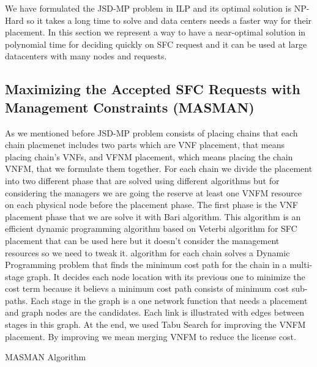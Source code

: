 We have formulated the JSD-MP problem in ILP and its optimal solution is NP-Hard so it takes a long time to solve and data centers needs a faster way for their placement.
In this section we represent a way to have a near-optimal solution in polynomial time for deciding quickly on SFC request and it can be used at large datacenters with many nodes and requests.

\subsection{Maximizing the Accepted SFC Requests with Management Constraints (MASMAN)}
As we mentioned before JSD-MP problem consists of placing chains that each chain placmenet includes two parts which are VNF placement, that means placing chain's VNFs, and VFNM placement, which means placing the chain VNFM, that we formulate them together.
For each chain we divide the placement into two different phase that are solved using different algorithms but for considering the managers we are going the reserve at least one VNFM resource on each physical node before the placement phase.
The first phase is the VNF placement phase that we are solve it with Bari \cite{Bari2015} algorithm.
This algorithm is an efficient dynamic programming algorithm based on Veterbi algorithm for SFC placement that can be used here but it doesn't consider the management resources so we need to tweak it.
\cite{Bari2015} algorithm for each chain solves a Dynamic Programming problem that finds the minimum cost path for the chain in a multi-stage graph.
It decides each node location with its previous one to minimize the cost term because it believs a minimum cost path consists of minimum cost sub-paths.
Each stage in the graph is a one network function that needs a placement and graph nodes are the candidates. Each link is illustrated with edges between stages in this graph.
At the end, we used Tabu Search for improving the VNFM placement. By improving we mean merging VNFM to reduce the license cost.

\begin{algorithm}
  \caption{MASMAN Algorithm}
  \label{alg:masman}
  \begin{algorithmic}[1]
      \EndIf
      \EndFor
      \Else
      \EndIf
      \EndIf
      \EndFor
      \EndFor
      \EndIf
      \EndFor
      \EndIf
      \EndFor
    \EndFor
    \EndFunction
  \end{algorithmic}
\end{algorithm}


